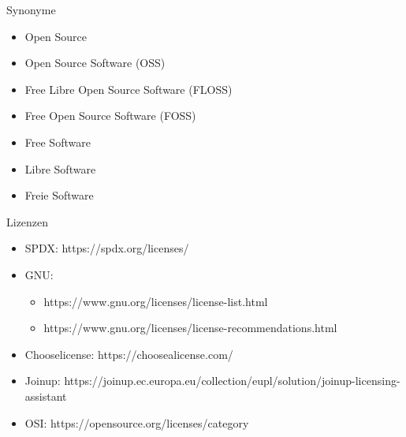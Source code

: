 



\begin{frame}
  \titlepage
\end{frame}

\begin{frame}{Synonyme}
  \begin{itemize}
  \item<1-> Open Source
  \item<4-> Open Source Software (OSS)
  \item<4-> Free Libre Open Source Software (FLOSS)
  \item<4-> Free Open Source Software (FOSS)
  \item<2-> Free Software
  \item<3-> Libre Software
  \item<5-> \color{blue}Freie Software
  \end{itemize}
\end{frame}

\begin{frame}{Lizenzen}
\begin{itemize}
\item SPDX: https://spdx.org/licenses/
\item GNU:
\begin{itemize}
\item https://www.gnu.org/licenses/license-list.html
\item https://www.gnu.org/licenses/license-recommendations.html
\end{itemize}
\item Chooselicense: https://choosealicense.com/
\item Joinup: https://joinup.ec.europa.eu/collection/eupl/solution/joinup-licensing-assistant
\item OSI: https://opensource.org/licenses/category
\end{itemize}
\end{frame}



